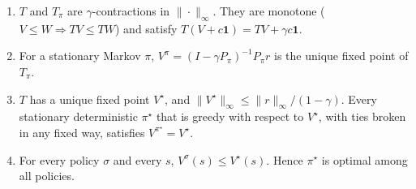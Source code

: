 \begin{lemma}\label{lem:occ-dp}
\leavevmode
\begin{enumerate}[nosep,label=(\roman*)]
\item $T$ and $T_\pi$ are $\gamma$-contractions in $\|\cdot\|_\infty$. They are monotone ($V\le W\Rightarrow TV\le TW$) and satisfy $T(V+c\mathbf1)=TV+\gamma c\mathbf1$.
\item For a stationary Markov $\pi$, $V^\pi=(I-\gamma P_\pi)^{-1}P_\pi r$ is the unique fixed point of $T_\pi$.
\item $T$ has a unique fixed point $V^\star$, and $\|V^\star\|_\infty\le\|r\|_\infty/(1-\gamma)$. Every stationary deterministic $\pi^\star$ that is greedy with respect to $V^\star$, with ties broken in any fixed way, satisfies $V^{\pi^\star}=V^\star$.
\item For every policy $\sigma$ and every $s$, $V^\sigma(s)\le V^\star(s)$. Hence $\pi^\star$ is optimal among all policies.
\end{enumerate}
\end{lemma}
